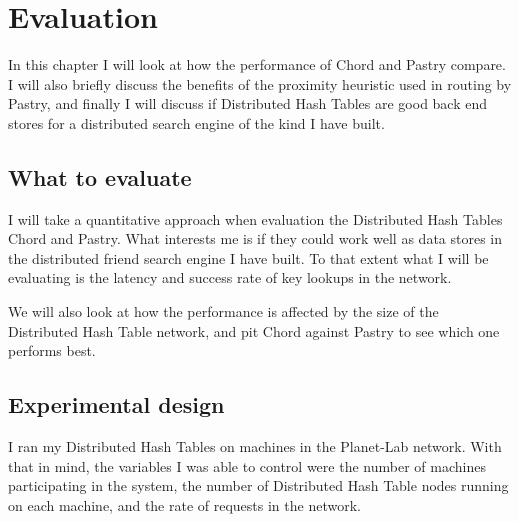 

%
%
%
% 
%

\section{Evaluation}
In this chapter I will look at how the performance of Chord and Pastry compare. I will also briefly discuss the benefits of the proximity heuristic used in routing by Pastry, and finally I will discuss if Distributed Hash Tables are good back end stores for a distributed search engine of the kind I have built.

\subsection{What to evaluate}
I will take a quantitative approach when evaluation the Distributed Hash Tables Chord and Pastry. What interests me is if they could work well as data stores in the distributed friend search engine I have built. To that extent what I will be evaluating is the latency and success rate of key lookups in the network.

We will also look at how the performance is affected by the size of the Distributed Hash Table network, and pit Chord against Pastry to see which one performs best.

\subsection{Experimental design}
I ran my Distributed Hash Tables on machines in the Planet-Lab network. With that in mind, the variables I was able to control were the number of machines participating in the system, the number of Distributed Hash Table nodes running on each machine, and the rate of requests in the network.

